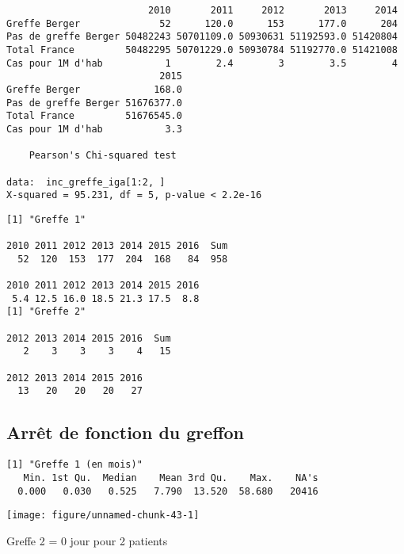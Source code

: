 \documentclass[11pt,a4paper]{article}\usepackage[]{graphicx}\usepackage[]{color}
\makeatletter
\def\maxwidth{ %
  \ifdim\Gin@nat@width>\linewidth
    \linewidth
  \else
    \Gin@nat@width
  \fi
}
\newenvironment{kframe}{%
 \def\at@end@of@kframe{}%
 \ifinner\ifhmode%
  \def\at@end@of@kframe{\end{minipage}}%
  \begin{minipage}{\columnwidth}%
 \fi\fi%
 \def\FrameCommand##1{\hskip\@totalleftmargin \hskip-\fboxsep
 \colorbox{shadecolor}{##1}\hskip-\fboxsep
     \hskip-\linewidth \hskip-\@totalleftmargin \hskip\columnwidth}%
 \MakeFramed {\advance\hsize-\width
   \@totalleftmargin\z@ \linewidth\hsize
   \@setminipage}}%
 {\par\unskip\endMakeFramed%
 \at@end@of@kframe}
\newenvironment{knitrout}{}{} %
\makeatother
\begin{document}
\begin{knitrout}
\color{fgcolor}\begin{kframe}
\begin{verbatim}
                         2010       2011     2012       2013     2014
Greffe Berger              52      120.0      153      177.0      204
Pas de greffe Berger 50482243 50701109.0 50930631 51192593.0 51420804
Total France         50482295 50701229.0 50930784 51192770.0 51421008
Cas pour 1M d'hab           1        2.4        3        3.5        4
                           2015
Greffe Berger             168.0
Pas de greffe Berger 51676377.0
Total France         51676545.0
Cas pour 1M d'hab           3.3

	Pearson's Chi-squared test

data:  inc_greffe_iga[1:2, ]
X-squared = 95.231, df = 5, p-value < 2.2e-16
\end{verbatim}
\end{kframe}
\end{knitrout}

\begin{knitrout}
\color{fgcolor}\begin{kframe}
\begin{verbatim}
[1] "Greffe 1"

2010 2011 2012 2013 2014 2015 2016  Sum 
  52  120  153  177  204  168   84  958 

2010 2011 2012 2013 2014 2015 2016 
 5.4 12.5 16.0 18.5 21.3 17.5  8.8 
[1] "Greffe 2"

2012 2013 2014 2015 2016  Sum 
   2    3    3    3    4   15 

2012 2013 2014 2015 2016 
  13   20   20   20   27 
\end{verbatim}
\end{kframe}
\end{knitrout}


  \subsection{Arrêt de fonction du greffon}
  
\begin{knitrout}
\color{fgcolor}\begin{kframe}
\begin{verbatim}
[1] "Greffe 1 (en mois)"
   Min. 1st Qu.  Median    Mean 3rd Qu.    Max.    NA's 
  0.000   0.030   0.525   7.790  13.520  58.680   20416 
\end{verbatim}
\end{kframe}
\texttt{[image: figure/unnamed-chunk-43-1]} 

\end{knitrout}
Greffe 2 = 0 jour pour 2 patients
~\\
\end{document}
